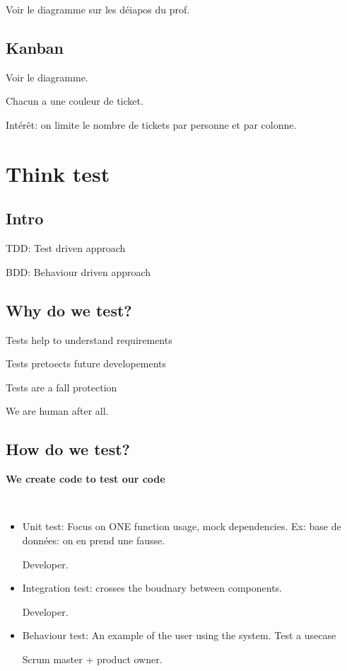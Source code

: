 \documentclass[a4paper,11pt]{article}
\begin{document}
Voir le diagramme sur les déiapos du prof.

\subsection{Kanban}

Voir le diagramme.

Chacun a une couleur de ticket.

Intérêt: on limite le nombre de tickets par personne et par colonne.

\section{Think test}

\subsection{Intro}

TDD: Test driven approach

BDD: Behaviour driven approach

\subsection{Why do we test?}

Tests help to understand requirements

Tests pretoects future developements

Tests are a fall protection

We are human after all.

\subsection{How do we test?}

\textbf{We create code to test our code}

\

\begin{itemize}

\item Unit test: Focus on ONE function usage, mock dependencies. Ex: base de
  données: on en prend une fausse.

  Developer.

\item Integration test: crosses the boudnary between components.

  Developer.

\item Behaviour test: An example of the user using the system. Test a usecase

  Scrum master + product owner.

\end{itemize}
\end{document}

